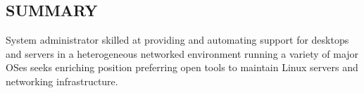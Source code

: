 \documentclass[line,margin]{res}
\begin{document}

\address{3403 Nicollet Ave S. Apt 4, Minneapolis, MN 55408}
\address{riggs@umn.edu 612.205.9789}
 
\begin{resume}
 
\section{SUMMARY}
    System administrator skilled at providing and automating support for
    desktops and servers in a heterogeneous networked environment running a
    variety of major OSes seeks enriching position preferring open tools to
    maintain Linux servers and networking infrastructure. 
 

\end{resume}
\end{document}
